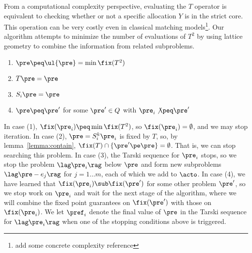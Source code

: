 From a computational complexity perspective, evaluating the $T$ operator is equivalent to checking whether or not a specific allocation $Y$ is in the strict core.
This operation can be very costly even in classical matching models\footnote{add some concrete complexity reference}.
Our algorithm attempts to minimize the number of evaluations of $T^2$ by using lattice geometry to combine the information from related subproblems. 

\begin{enumerate}
\item $\pre \peq \ul{\pre} = \min \fix(T^2)$ 
\item $T \pre = \pre$
\item $S_i \pre = \pre$
\item $\pre \peq \pre'$ for some $\pre' \in Q$ with $\pre_i \not \peq \pre'$ 
\end{enumerate} 

In case (1), $\fix(\pre_i) \peq \min \fix(T^2)$, so $\fix(\pre_i) = \emptyset$, and we may stop iteration. 
In case (2), $\pre = S_i^k \pre_i$ is fixed by $T$, so, by lemma~\ref{lemma:contain}, $\fix(T) \cap \{\pre' \pe \pre \} = \emptyset$.
That is, we can stop searching this problem.
In case (3), the Tarski sequence for $\pre_i$ stops, so we stop the problem $\lag \pre_i \rag$ below $\pre$ and form new subproblems $\lag \pre - e_j \rag$ for $j = 1 \hdots m$, each of which we add to $\acto$.  
In case (4), we have learned that $\fix(\pre_i) \sub \fix(\pre')$ for some other problem $\pre'$, so we stop work on $\pre_i$ and wait for the next stage of the algorithm, where we will combine the fixed point guarantees on $\fix(\pre')$ with those on $\fix(\pre_i)$.
We let $\pref_i$ denote the final value of $\pre$ in the Tarski sequence for $\lag \pre_i \rag$ when one of the stopping conditions above is triggered. 




